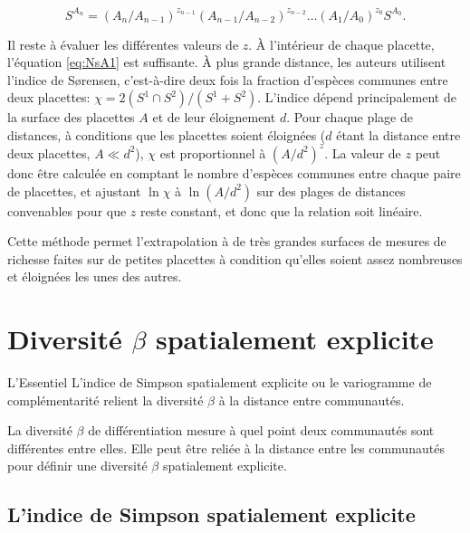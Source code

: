 \documentclass[
  11pt,
  french,
  a4paper,
  extrafontsizes,onecolumn,openright
  ]{memoir}
\newenvironment{Summary}
  {\begin{bclogo}[logo=\bctrombone, noborder=true, couleur=lightgray!50]{L'Essentiel}\parindent0pt}
  {\end{bclogo}}
\newlength{\rf}
\begin{document}
\begin{equation}
  \label{eq:NsAn}
  S^{A_n} = {\left({A_n}/{A_{n-1}}\right)}^{z_{n-1}}{\left({A_{n-1}}/{A_{n -2}}\right)}^{z_{n-2}} \dots{\left({A_1}/{A_0}\right)}^{z_0}S^{A_0}.
\end{equation}

Il reste à évaluer les différentes valeurs de \(z\).
À l'intérieur de chaque placette, l'équation \eqref{eq:NsA1} est suffisante.
À plus grande distance, les auteurs utilisent l'indice de Sørensen, c'est-à-dire deux fois la fraction d'espèces communes entre deux placettes: \(\chi=2{\left(S^{1} \cap S^{2}\right)}/{\left(S^{1}+S^{2}\right)}\).
L'indice dépend principalement de la surface des placettes \(A\) et de leur éloignement \(d\).
Pour chaque plage de distances, à conditions que les placettes soient éloignées (\(d\) étant la distance entre deux placettes, \({A} \ll d^2\)), \(\chi\) est proportionnel à \(({A}/{d^2})^z\).
La valeur de \(z\) peut donc être calculée en comptant le nombre d'espèces communes entre chaque paire de placettes, et ajustant \(\ln\chi\) à \(\ln({A}/{d^2})\) sur des plages de distances convenables pour que \(z\) reste constant, et donc que la relation soit linéaire.

Cette méthode permet l'extrapolation à de très grandes surfaces de mesures de richesse faites sur de petites placettes à condition qu'elles soient assez nombreuses et éloignées les unes des autres.

\hypertarget{chap:betasp}{%
\chapter{\texorpdfstring{Diversité \(\beta\) spatialement explicite}{Diversité \textbackslash beta spatialement explicite}}\label{chap:betasp}}

\scriptsize

\begin{Summary}
L'indice de Simpson spatialement explicite ou le variogramme de
complémentarité relient la diversité \(\beta\) à la distance entre
communautés.
\end{Summary}

\normalsize

La diversité \(\beta\) de différentiation mesure à quel point deux communautés sont différentes entre elles.
Elle peut être reliée à la distance entre les communautés pour définir une diversité \(\beta\) spatialement explicite.

\hypertarget{sec:SimpsonSpatial}{%
\section{L'indice de Simpson spatialement explicite}\label{sec:SimpsonSpatial}}
\end{document}
